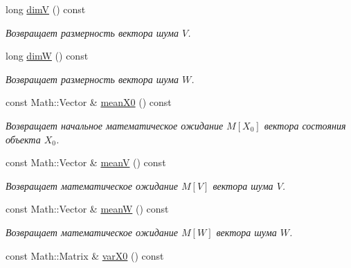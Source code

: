 \begin{DoxyCompactItemize}
long \hyperlink{class_core_1_1_task_add33d4a561733297f8e6d6c01ffc3972}{dimV} () const
\begin{DoxyCompactList}\small\item\em Возвращает размерность вектора шума $V$. \end{DoxyCompactList}\item 
\hypertarget{class_core_1_1_task_a2ce119af0f8d7e5a8c8918bd6d10e5cd}{}\label{class_core_1_1_task_a2ce119af0f8d7e5a8c8918bd6d10e5cd} 
long \hyperlink{class_core_1_1_task_a2ce119af0f8d7e5a8c8918bd6d10e5cd}{dimW} () const
\begin{DoxyCompactList}\small\item\em Возвращает размерность вектора шума $W$. \end{DoxyCompactList}\item 
\hypertarget{class_core_1_1_task_a0c495dff380a10f63d377410e7a33557}{}\label{class_core_1_1_task_a0c495dff380a10f63d377410e7a33557} 
const Math\+::\+Vector \& \hyperlink{class_core_1_1_task_a0c495dff380a10f63d377410e7a33557}{mean\+X0} () const
\begin{DoxyCompactList}\small\item\em Возвращает начальное математическое ожидание $M[X_0]$ вектора состояния объекта $X_0$. \end{DoxyCompactList}\item 
\hypertarget{class_core_1_1_task_ab74631619b0e49b30bb37fe7cf7be150}{}\label{class_core_1_1_task_ab74631619b0e49b30bb37fe7cf7be150} 
const Math\+::\+Vector \& \hyperlink{class_core_1_1_task_ab74631619b0e49b30bb37fe7cf7be150}{meanV} () const
\begin{DoxyCompactList}\small\item\em Возвращает математическое ожидание $M[V]$ вектора шума $V$. \end{DoxyCompactList}\item 
\hypertarget{class_core_1_1_task_a4162f11451f54e4109d336a2ddbc0527}{}\label{class_core_1_1_task_a4162f11451f54e4109d336a2ddbc0527} 
const Math\+::\+Vector \& \hyperlink{class_core_1_1_task_a4162f11451f54e4109d336a2ddbc0527}{meanW} () const
\begin{DoxyCompactList}\small\item\em Возвращает математическое ожидание $M[W]$ вектора шума $W$. \end{DoxyCompactList}\item 
\hypertarget{class_core_1_1_task_a2c7381e4278d9a94a09c06b97e887ce9}{}\label{class_core_1_1_task_a2c7381e4278d9a94a09c06b97e887ce9} 
const Math\+::\+Matrix \& \hyperlink{class_core_1_1_task_a2c7381e4278d9a94a09c06b97e887ce9}{var\+X0} () const

\end{DoxyCompactItemize}

